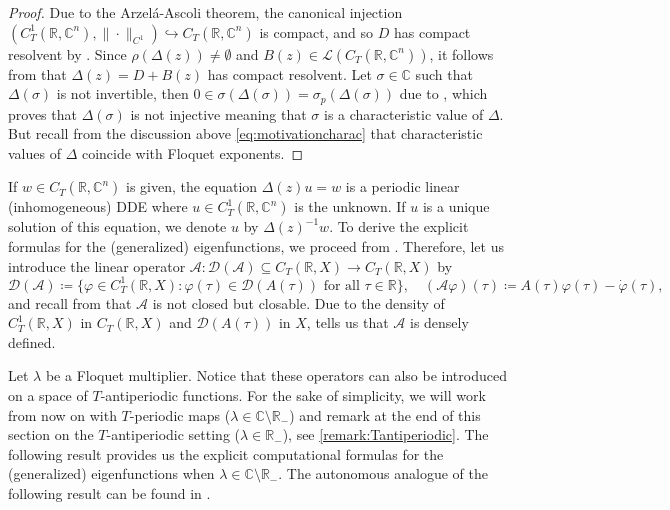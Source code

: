 \documentclass[english]{myarticle}
\begin{document}
\begin{sloppypar}
\begin{proof}
Due to the Arzel\'a-Ascoli theorem, the canonical injection $(C_T^1(\mathbb{R},\mathbb{C}^n),\|\cdot\|_{C^1}) \hookrightarrow C_T(\mathbb{R},\mathbb{C}^n)$ is compact, and so $D$ has compact resolvent by \cite[Proposition II.4.25]{Engel2000}. Since $\rho(\Delta(z)) \neq \emptyset$ and $B(z) \in \mathcal{L}(C_T(\mathbb{R},\mathbb{C}^n))$, it follows from \cite[Exercise II.4.30]{Engel2000} that $\Delta(z) = D + B(z)$ has compact resolvent. Let $\sigma \in \mathbb{C}$ such that $\Delta(\sigma)$ is not invertible, then $0 \in \sigma(\Delta(\sigma)) = \sigma_p(\Delta(\sigma))$ due to \cite[Corollary IV.1.19]{Engel2000}, which proves that $\Delta(\sigma)$ is not injective meaning that $\sigma$ is a characteristic value of $\Delta$. But recall from the discussion above \eqref{eq:motivationcharac} that characteristic values of $\Delta$ coincide with Floquet exponents.
\end{proof}

If $w \in C_T(\mathbb{R},\mathbb{C}^n)$ is given, the equation $\Delta(z)u = w$ is a periodic linear (inhomogeneous) DDE where $u \in C_T^1(\mathbb{R},\mathbb{C}^n)$ is the unknown. If $u$ is a unique solution of this equation, we denote $u$ by $\Delta(z)^{-1} w$. 
To derive the explicit formulas for the (generalized) eigenfunctions, we proceed from \cite[Section 3.1]{Article2}. Therefore, let us introduce the linear operator $\mathcal{A} : \mathcal{D}(\mathcal{A}) \subseteq C_T(\mathbb{R},X) \to C_T(\mathbb{R},X)$ by
\begin{equation*}
    \mathcal{D}(\mathcal{A}) \coloneqq \{ \varphi \in C_T^1(\mathbb{R},X) : \varphi(\tau) \in \mathcal{D}(A(\tau)) \mbox{ for all $\tau \in \mathbb{R}$} \}, \quad 
    (\mathcal{A}\varphi)(\tau) \coloneqq A(\tau)\varphi(\tau) - \dot{\varphi}(\tau),
\end{equation*}
and recall from \cite[Proposition 7]{Article1} that $\mathcal{A}$ is not closed but closable. Due to the density of $C_T^1(\mathbb{R},X)$ in $C_T(\mathbb{R},X)$ and $\mathcal{D}(A(\tau))$ in $X$, \cite[Lemma 17]{Article1} tells us that $\mathcal{A}$ is densely defined.

Let $\lambda$ be a Floquet multiplier. Notice that these operators can also be introduced on a space of $T$-antiperiodic functions. For the sake of simplicity, we will work from now on with $T$-periodic maps ($\lambda \in \mathbb{C} \setminus \mathbb{R}_{-}$) and remark at the end of this section on the $T$-antiperiodic setting ($\lambda \in \mathbb{R}_{-}$), see \cref{remark:Tantiperiodic}. The following result provides us the explicit computational formulas for the (generalized) eigenfunctions when $\lambda \in \mathbb{C} \setminus \mathbb{R}_{-}$. The autonomous analogue of the following result can be found in \cite[Theorem IV.5.5]{Diekmann1995}.


\end{sloppypar}
\end{document}
